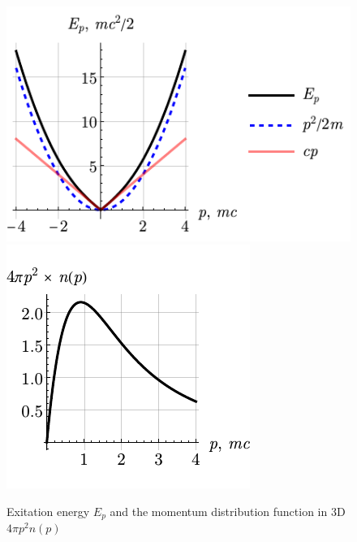 \begin{figure}[h]
    \centering
    \includegraphics{imgs/MB71.pdf}
    \hspace{10 mm} 
    \includegraphics{imgs/MB72.pdf}
    \caption{Exitation energy $E_p$ and the momentum distribution function in 3D $4 \pi p^2 n(p)$}
    \label{fig:MB712}
\end{figure}


